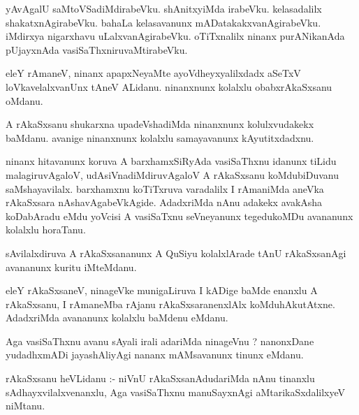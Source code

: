 \documentclass{article}
\begin{document}
\begin{mn}
yAvAgalU  saMtoVSadiMdirabeVku.  shAnitxyiMda  irabeVku.  kelasadalilx  shakatxnAgirabeVku.  bahaLa  
kelasavanunx  mADatakakxvanAgirabeVku. iMdirxya  nigarxhavu  uLalxvanAgirabeVku.  oTiTxnalilx  ninanx  
purANikanAda  pUjayxnAda  vasiSaThxniruvaMtirabeVku.
\end{mn}

\begin{mn}
eleY  rAmaneV,  ninanx  apapxNeyaMte  ayoVdheyxyalilxdadx  aSeTxV  loVkavelalxvanUnx  tAneV  ALidanu.  
ninanxnunx  kolalxlu  obabxrAkaSxsanu  oMdanu.
\end{mn}

\begin{mn}
A  rAkaSxsanu  shukarxna  upadeVshadiMda  ninanxnunx  kolulxvudakekx  baMdanu.  avanige  ninanxnunx  
kolalxlu  samayavanunx  kAyutitxdadxnu.
\end{mn}

\begin{mn}
ninanx  hitavanunx  koruva  A  barxhamxSiRyAda  vasiSaThxnu  idanunx  tiLidu  malagiruvAgaloV,  
udAsiVnadiMdiruvAgaloV  A  rAkaSxsanu  koMdubiDuvanu  saMshayavilalx.  barxhamxnu  koTiTxruva  varadalilx  
I  rAmaniMda  aneVka  rAkaSxsara  nAshavAgabeVkAgide.  AdadxriMda  nAnu  adakekx  avakAsha  koDabAradu  eMdu  
yoVcisi  A  vasiSaTxnu  seVneyanunx  tegedukoMDu  avananunx  kolalxlu  horaTanu.
\end{mn}

\begin{mn}
sAvilalxdiruva  A  rAkaSxsananunx  A  QuSiyu  kolalxlArade  tAnU  rAkaSxsanAgi  avananunx  kuritu  iMteMdanu.
\end{mn}

\begin{mn}
eleY  rAkaSxsaneV,  ninageVke  munigaLiruva  I  kADige  baMde  enanxlu  A  rAkaSxsanu,  I  rAmaneMba  rAjanu  
rAkaSxsaranenxlAlx  koMduhAkutAtxne.  AdadxriMda  avananunx  kolalxlu  baMdenu  eMdanu.
\end{mn}

\begin{mn}
Aga  vasiSaThxnu  avanu  sAyali  irali  adariMda  ninageVnu ?  nanonxDane  yudadhxmADi  jayashAliyAgi  
nananx  mAMsavanunx  tinunx  eMdanu.
\end{mn}

\begin{mn}
rAkaSxsanu  heVLidanu :- niVnU  rAkaSxsanAdudariMda  nAnu  tinanxlu  sAdhayxvilalxvenanxlu,  Aga  
vasiSaThxnu  manuSayxnAgi  aMtarikaSxdalilxyeV  niMtanu.
\end{mn}
\end{document}

